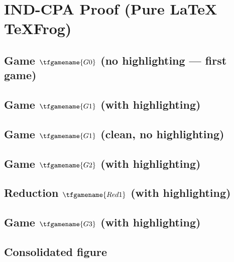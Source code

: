 \documentclass{article}
\begin{document}
\section*{IND-CPA Proof (Pure \LaTeX{} TeXFrog)}

\subsection*{Game $\tfgamename{G0}$ (no highlighting --- first game)}

\subsection*{Game $\tfgamename{G1}$ (with highlighting)}

\subsection*{Game $\tfgamename{G1}$ (clean, no highlighting)}

\subsection*{Game $\tfgamename{G2}$ (with highlighting)}

\subsection*{Reduction $\tfgamename{Red1}$ (with highlighting)}

\subsection*{Game $\tfgamename{G3}$ (with highlighting)}

\subsection*{Consolidated figure}
\end{document}
